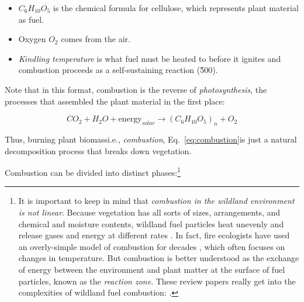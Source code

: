 \begin{itemize}
	\item $C_{6}H_{10}O_{5}$ is the chemical formula for cellulose, which represents plant material as fuel. 
	\item Oxygen $O_{2}$ comes from the air. 
	\item \emph{Kindling temperature} is what fuel must be heated to before it ignites and combustion proceeds as a self-sustaining reaction (\~500\degC).
\end{itemize}

Note that in this format, combustion is the reverse of \emph{photosynthesis}, the processes that assembled the plant material in the first place:

\begin{equation}\label{eq:photosynthesis}
	CO_{2} + H_{2}O + \text{energy}_{solar} \rightarrow (C_{6}H_{10}O_{5})_{n} + O_{2}
\end{equation}

Thus, burning plant biomass\textemdash i.e., \emph{combustion}, Eq.~\ref{eq:combustion}\textemdash is just a natural decomposition process that breaks down vegetation. 

Combustion can be divided into distinct phases:\footnote{It is important to keep in mind that \textit{combustion in the wildland environment is not linear}. 
	Because vegetation has all sorts of sizes, arrangements, and chemical and moisture contents, wildland fuel particles heat unevenly and release gases and energy at different rates \citep{sullivan2012, finney2013}.
	In fact, fire ecologists have used an overly-simple model of combustion for decades \citep{sullivan2017}, which often focuses on changes in temperature.
	But combustion is better understood as the exchange of energy between the environment and plant matter at the surface of fuel particles, known as the \emph{reaction zone}. 
	These review papers really get into the complexities of wildland fuel combustion: \citep{sullivan2012, sullivan2017, sullivan2017a}.  
} 

